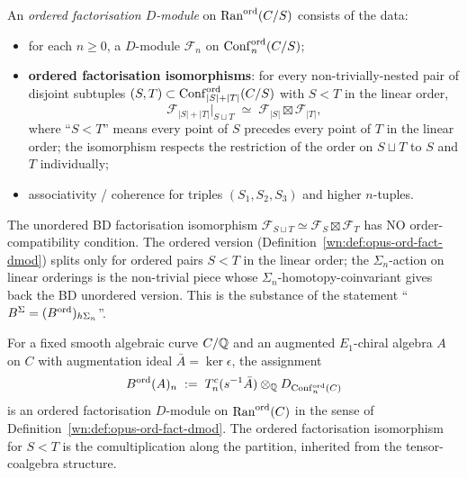 \begin{definition}
\label{wn:def:opus-ord-fact-dmod}
An \emph{ordered factorisation $D$-module} on $\mathrm{Ran}^{\mathrm{ord}}(C/S)$
consists of the data:
\begin{itemize}
\item for each $n \ge 0$, a $D$-module $\mathcal{F}_n$ on
$\mathrm{Conf}_n^{\mathrm{ord}}(C/S)$;
\item \textbf{ordered factorisation isomorphisms}: for every
non-trivially-nested pair of disjoint subtuples $(S, T) \subset
\mathrm{Conf}_{|S|+|T|}^{\mathrm{ord}}(C/S)$ with $S < T$ in the linear order,
\[
\mathcal{F}_{|S|+|T|}\big|_{S \sqcup T} \;\simeq\;
\mathcal{F}_{|S|} \boxtimes \mathcal{F}_{|T|},
\]
where ``$S < T$'' means every point of $S$ precedes every point of $T$
in the linear order; the isomorphism respects the restriction of the
order on $S \sqcup T$ to $S$ and $T$ individually;
\item associativity / coherence for triples $(S_1, S_2, S_3)$ and
higher $n$-tuples.
\end{itemize}
\end{definition}

\begin{remark}
\label{wn:rem:opus-ord-vs-bd}
The unordered BD factorisation isomorphism
$\mathcal{F}_{S \sqcup T} \simeq \mathcal{F}_S \boxtimes \mathcal{F}_T$
has NO order-compatibility condition. The ordered version
(Definition~\ref{wn:def:opus-ord-fact-dmod}) splits only for ordered
pairs $S < T$ in the linear order; the $\Sigma_n$-action on linear
orderings is the non-trivial piece whose $\Sigma_n$-homotopy-coinvariant
gives back the BD unordered version. This is the substance of the
statement ``$B^{\Sigma} = (B^{\mathrm{ord}})_{h\Sigma_n}$''.
\end{remark}

\begin{proposition}
\label{wn:prop:opus-bord-fact}\ClaimStatusTheorem
For a fixed smooth algebraic curve $C/\mathbb{Q}$ and an augmented $E_1$-chiral
algebra $A$ on $C$ with augmentation ideal $\bar A = \ker \epsilon$, the
assignment
\[
B^{\mathrm{ord}}(A)_n \;:=\; T^c_n(s^{-1} \bar A) \otimes_{\mathbb{Q}}
D_{\mathrm{Conf}_n^{\mathrm{ord}}(C)}
\]
is an ordered factorisation $D$-module on $\mathrm{Ran}^{\mathrm{ord}}(C)$ in
the sense of Definition~\ref{wn:def:opus-ord-fact-dmod}. The ordered
factorisation isomorphism for $S < T$ is the comultiplication along the
partition, inherited from the tensor-coalgebra structure.
\end{proposition}

